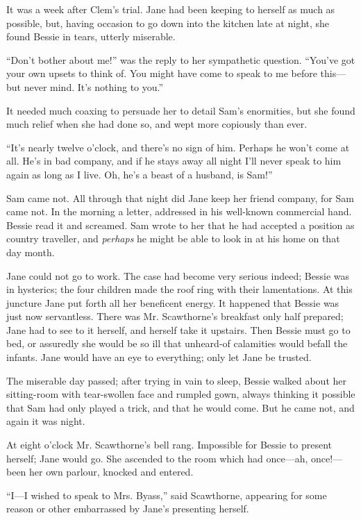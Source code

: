 It was a week after Clem's trial. Jane had been keeping to herself as
much as possible, but, having occasion to go down into the kitchen late
at night, she found Bessie in tears, utterly miserable.

``Don't bother about me!'' was the reply to her sympathetic question.
``You've got {}your own upsets to think of. You might have come to speak
to me before this---but never mind. It's nothing to you.''

It needed much coaxing to persuade her to detail Sam's enormities, but
she found much relief when she had done so, and wept more copiously than
ever.

``It's nearly twelve o'clock, and there's no sign of him. Perhaps he
won't come at all. He's in bad company, and if he stays away all night
I'll never speak to him again as long as I live. Oh, he's a beast of a
husband, is Sam!''

Sam came not. All through that night did Jane keep her friend company,
for Sam came not. In the morning a letter, addressed in his well-known
commercial hand. Bessie read it and screamed. Sam wrote to her that he
had accepted a position as country traveller, and \emph{perhaps} he
might be able to look in at his home on that day month.

Jane could not go to work. The case had become very serious indeed;
Bessie was in hysterics; the four children made the roof ring with their
lamentations. At this juncture Jane put forth all her beneficent energy.
{}It happened that Bessie was just now servantless. There was Mr.
Scawthorne's breakfast only half prepared; Jane had to see to it
herself, and herself take it upstairs. Then Bessie must go to bed, or
assuredly she would be so ill that unheard-of calamities would befall
the infants. Jane would have an eye to everything; only let Jane be
trusted.

The miserable day passed; after trying in vain to sleep, Bessie walked
about her sitting-room with tear-swollen face and rumpled gown, always
thinking it possible that Sam had only played a trick, and that he would
come. But he came not, and again it was night.

At eight o'clock Mr. Scawthorne's bell rang. Impossible for Bessie to
present herself; Jane would go. She ascended to the room which had
once---ah, once!---been her own parlour, knocked and entered.

``I---I wished to speak to Mrs. Byass,'' said Scawthorne, appearing for
some reason or other embarrassed by Jane's presenting herself.

